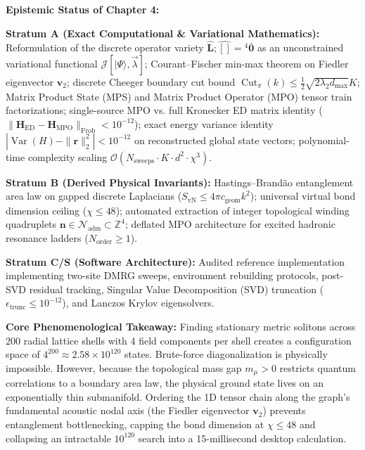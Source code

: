 \documentclass[
    12pt,
    a4paper,
    headings=normal,
    twoside=false,
    open=any,
    parskip=half
]{scrbook}
\newcommand{\spectrumN}{\mathcal{N}_{\text{adm}}}
\begin{document}
\begin{firewallbox}
\textbf{Epistemic Status of Chapter 4:}\par\smallskip\noindent
\textbf{Stratum A (Exact Computational \& Variational Mathematics):} Reformulation of the discrete operator variety $\hat{\mathbf{L}} ; \hat{\mathbf{[]}} = {}^4\bar{\mathbf{0}}$ as an unconstrained variational functional $\mathcal{J}[|\Psi\rangle, \vec{\lambda}]$; Courant--Fischer min-max theorem on Fiedler eigenvector $\mathbf{v}_2$; discrete Cheeger boundary cut bound $\operatorname{Cut}_{\pi}(k) \le \frac{1}{2}\sqrt{2\lambda_2 d_{\max}} K$; Matrix Product State (MPS) and Matrix Product Operator (MPO) tensor train factorizations; single-source MPO vs. full Kronecker ED matrix identity ($\|\mathbf{H}_{\text{ED}} - \mathbf{H}_{\text{MPO}}\|_{\text{Frob}} < 10^{-12}$); exact energy variance identity $|\operatorname{Var}(H) - \|\mathbf{r}\|_2^2| < 10^{-12}$ on reconstructed global state vectors; polynomial-time complexity scaling $\mathcal{O}(N_{\text{sweeps}} \cdot K \cdot d^2 \cdot \chi^3)$.\par\smallskip\noindent
\textbf{Stratum B (Derived Physical Invariants):} Hastings--Brand\~{a}o entanglement area law on gapped discrete Laplacians ($S_{\text{vN}} \le 4\pi c_{\text{geom}} k^2$); universal virtual bond dimension ceiling ($\chi \le 48$); automated extraction of integer topological winding quadruplets $\mathbf{n} \in \spectrumN \subset \mathbb{Z}^4$; deflated MPO architecture for excited hadronic resonance ladders ($N_{\text{order}} \ge 1$).\par\smallskip\noindent
\textbf{Stratum C/S (Software Architecture):} Audited reference implementation implementing two-site DMRG sweeps, environment rebuilding protocols, post-SVD residual tracking, Singular Value Decomposition (SVD) truncation ($\epsilon_{\text{trunc}} \le 10^{-12}$), and Lanczos Krylov eigensolvers.\par\smallskip\noindent
\textbf{Core Phenomenological Takeaway:} Finding stationary metric solitons across 200 radial lattice shells with 4 field components per shell creates a configuration space of $4^{200} \approx 2.58 \times 10^{120}$ states. Brute-force diagonalization is physically impossible. However, because the topological mass gap $m_\mu > 0$ restricts quantum correlations to a boundary area law, the physical ground state lives on an exponentially thin submanifold. Ordering the 1D tensor chain along the graph's fundamental acoustic nodal axis (the Fiedler eigenvector $\mathbf{v}_2$) prevents entanglement bottlenecking, capping the bond dimension at $\chi \le 48$ and collapsing an intractable $10^{120}$ search into a 15-millisecond desktop calculation.
\end{firewallbox}
\end{document}
